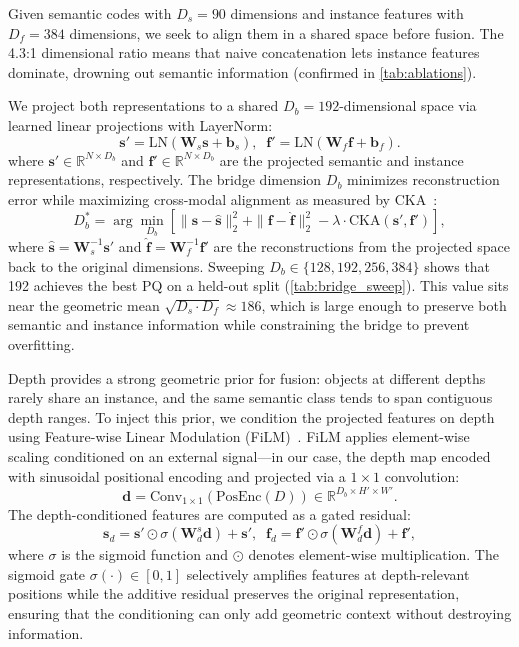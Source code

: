 \documentclass[10pt,twocolumn,letterpaper]{article}
\begin{document}
Given semantic codes with $D_s{=}90$ dimensions and instance features with $D_f{=}384$ dimensions, we seek to align them in a shared space before fusion. The 4.3:1 dimensional ratio means that naive concatenation lets instance features dominate, drowning out semantic information (confirmed in \cref{tab:ablations}).

We project both representations to a shared $D_b{=}192$-dimensional space via learned linear projections with LayerNorm:
\begin{equation}
\mathbf{s}' = \text{LN}(\mathbf{W}_s \mathbf{s} + \mathbf{b}_s), \;\;
\mathbf{f}' = \text{LN}(\mathbf{W}_f \mathbf{f} + \mathbf{b}_f).
\label{eq:projection}
\end{equation}
where $\mathbf{s}' \in \mathbb{R}^{N \times D_b}$ and $\mathbf{f}' \in \mathbb{R}^{N \times D_b}$ are the projected semantic and instance representations, respectively. The bridge dimension $D_b$ minimizes reconstruction error while maximizing cross-modal alignment as measured by CKA~\cite{kornblith2019cka}:
\begin{equation}
D_b^* = \arg\min_{D_b} \left[\|\mathbf{s} {-} \hat{\mathbf{s}}\|_2^2 + \|\mathbf{f} {-} \hat{\mathbf{f}}\|_2^2 - \lambda \cdot \text{CKA}(\mathbf{s}', \mathbf{f}')\right]\!,
\label{eq:optimal_bridge}
\end{equation}
where $\hat{\mathbf{s}} = \mathbf{W}_s^{-1}\mathbf{s}'$ and $\hat{\mathbf{f}} = \mathbf{W}_f^{-1}\mathbf{f}'$ are the reconstructions from the projected space back to the original dimensions.
Sweeping $D_b \in \{128, 192, 256, 384\}$ shows that 192 achieves the best PQ on a held-out split (\cref{tab:bridge_sweep}). This value sits near the geometric mean $\sqrt{D_s \cdot D_f} \approx 186$, which is large enough to preserve both semantic and instance information while constraining the bridge to prevent overfitting.

Depth provides a strong geometric prior for fusion: objects at different depths rarely share an instance, and the same semantic class tends to span contiguous depth ranges. To inject this prior, we condition the projected features on depth using Feature-wise Linear Modulation (FiLM)~\cite{perez2018film}. FiLM applies element-wise scaling conditioned on an external signal---in our case, the depth map encoded with sinusoidal positional encoding and projected via a $1{\times}1$ convolution:
\begin{equation}
\mathbf{d} = \text{Conv}_{1 \times 1}(\text{PosEnc}(D)) \in \mathbb{R}^{D_b \times H' \times W'}.
\end{equation}
The depth-conditioned features are computed as a gated residual:
\begin{equation}
\mathbf{s}_d = \mathbf{s}' \odot \sigma(\mathbf{W}_d^s \mathbf{d}) + \mathbf{s}', \;\;
\mathbf{f}_d = \mathbf{f}' \odot \sigma(\mathbf{W}_d^f \mathbf{d}) + \mathbf{f}',
\label{eq:film}
\end{equation}
where $\sigma$ is the sigmoid function and $\odot$ denotes element-wise multiplication. The sigmoid gate $\sigma(\cdot) \in [0, 1]$ selectively amplifies features at depth-relevant positions while the additive residual preserves the original representation, ensuring that the conditioning can only add geometric context without destroying information.
\end{document}
